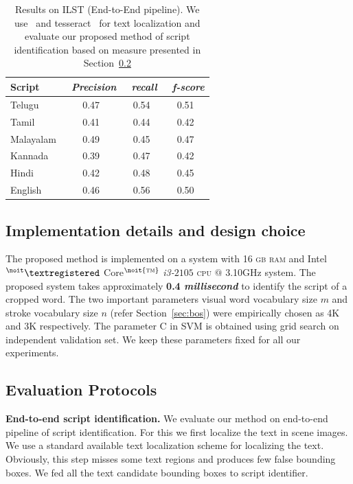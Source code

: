 \begin{table}[!t]
\caption{Results on ILST (End-to-End pipeline). We use~\cite{GomezK14} and tesseract~\cite{tessOCR} for text localization and evaluate our proposed method of script identification based on measure presented in Section~\ref{sec:perf}} 
\centering
\begin{tabular}{|l|c|c|c|}
  \hline    
  Script &~\emph{Precision}&~\emph{recall}&~\emph{f-score}  \\      
  \hline\hline          
  Telugu & 0.47 & 0.54 & 0.51 \\
  Tamil & 0.41 & 0.44 & 0.42\\
  Malayalam & 0.49 & 0.45 & 0.47 \\
  Kannada & 0.39 & 0.47 & 0.42\\
  Hindi & 0.42 & 0.48 & 0.45\\
  English & 0.46 & 0.56 & 0.50\\
  \hline  
\end{tabular}
\label{tab:ILSTRes2} 
\end{table}

\subsection{Implementation details and design choice}
The proposed method is implemented on a system with 16 \textsc{gb ram} and
Intel${^\noit\textregistered}$ Core$^{\noit{\textsc{\scriptsize{tm}}}}$ \textit{i3-$2105$} \textsc{cpu} $@$ 3.10GHz system. The proposed system takes approximately \textbf{0.4 \textit{millisecond}} to identify the script of a cropped word. The two important parameters visual word vocabulary size $m$ and stroke vocabulary size $n$ (refer Section~\ref{sec:bos}) were empirically chosen as 4K and 3K respectively. The parameter C in SVM is obtained using grid search on independent validation set. We keep these parameters fixed for all our experiments.  

\subsection{Evaluation Protocols}
\label{sec:perf}
\noindent \textbf{End-to-end script identification.}
We evaluate our method on end-to-end pipeline of script
identification. For this we first localize the text 
in scene images. We use a standard available text localization
scheme for localizing the text. Obviously, this step misses 
some text regions and produces few false bounding boxes. 
We fed all the text candidate bounding boxes to script identifier.

